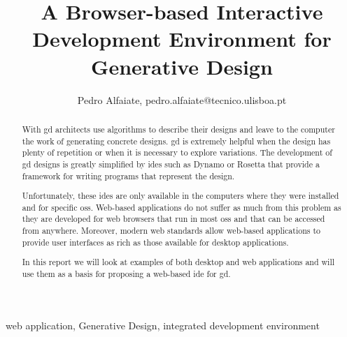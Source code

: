 \documentclass{./llncs2e/llncs}
\begin{document}
	
\setcounter{tocdepth}{2}
\makeatletter
\renewcommand*\l@author[2]{}
\renewcommand*\l@title[2]{}
\makeatother
	
	
\title{A Browser-based Interactive Development Environment for Generative Design}

\author{Pedro Alfaiate, pedro.alfaiate@tecnico.ulisboa.pt}

\maketitle

\begin{abstract}
	
	With \ac{gd} architects use algorithms to describe their designs and leave to the computer the work of generating concrete designs.
	\ac{gd} is extremely helpful when the design has plenty of repetition or when it is necessary to explore variations.
	The development of \ac{gd} designs is greatly simplified by \acp{ide} such as Dynamo or Rosetta that provide a framework for writing programs that represent the design.

	Unfortunately, these \acp{ide} are only available in the computers where they were installed and for specific \acp{os}.
	Web-based applications do not suffer as much from this problem as they are developed for web browsers that run in most \acp{os} and that can be accessed from anywhere. 
	Moreover, modern web standards allow web-based applications to provide user interfaces as rich as those available for desktop applications.

	In this report we will look at examples of both desktop and web applications and will use them as a basis for proposing a web-based \ac{ide} for \ac{gd}.
\end{abstract}
\begin{keywords}
web application, Generative Design, integrated development environment
\end{keywords}
\end{document}
